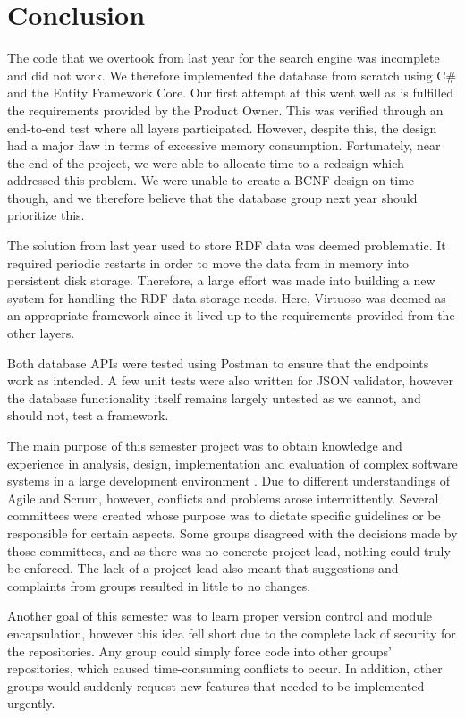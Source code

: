 \chapter{Conclusion}\label{ch:conclusion}
The code that we overtook from last year for the search engine was incomplete and did not work.
We therefore implemented the database from scratch using C\# and the Entity Framework Core.
Our first attempt at this went well as is fulfilled the requirements provided by the Product Owner. 
This was verified through an end-to-end test where all \knox{} layers participated.
However, despite this, the design had a major flaw in terms of excessive memory consumption. 
Fortunately, near the end of the project, we were able to allocate time to a redesign which addressed this problem.
We were unable to create a BCNF design on time though, and we therefore believe that the database group next year should prioritize this.

The solution from last year used to store RDF data was deemed problematic.
It required periodic restarts in order to move the data from in memory into persistent disk storage.
Therefore, a large effort was made into building a new system for handling the \knox{} RDF data storage needs. 
Here, Virtuoso was deemed as an appropriate framework since it lived up to the requirements provided from the other layers. 

Both database APIs were tested using Postman to ensure that the endpoints work as intended.
A few unit tests were also written for JSON validator, however the database functionality itself remains largely untested as we cannot, and should not, test a framework.

The main purpose of this semester project was to obtain knowledge and experience in analysis, design, implementation and evaluation of complex software systems in a large development environment \cite{AAULearningGoals5thSemester}.
Due to different understandings of Agile and Scrum, however, conflicts and problems arose intermittently.
Several committees were created whose purpose was to dictate specific guidelines or be responsible for certain aspects.
Some groups disagreed with the decisions made by those committees, and as there was no concrete project lead, nothing could truly be enforced. 
The lack of a project lead also meant that suggestions and complaints from groups resulted in little to no changes.


Another goal of this semester was to learn proper version control and module encapsulation, however this idea fell short due to the complete lack of security for the \knox{} repositories. 
Any group could simply force code into other groups' repositories, which caused time-consuming conflicts to occur.
In addition, other groups would suddenly request new features that needed to be implemented urgently.


